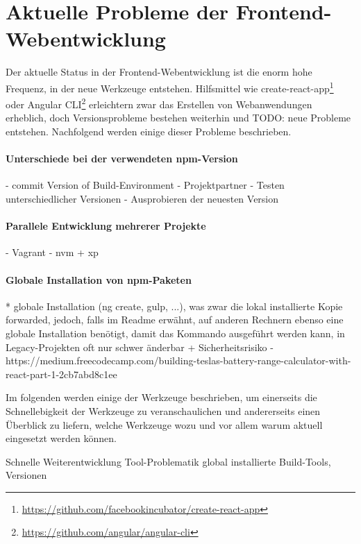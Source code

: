 \chapter{Aktuelle Probleme der Frontend-Webentwicklung}
\label{cha:frontend-problems}

Der aktuelle Status in der Frontend-Webentwicklung ist die enorm hohe Frequenz, in der neue Werkzeuge entstehen.
Hilfsmittel wie create-react-app\footnote{\url{https://github.com/facebookincubator/create-react-app}} oder Angular CLI\footnote{\url{https://github.com/angular/angular-cli}} erleichtern zwar das Erstellen von Webanwendungen erheblich, doch Versionsprobleme bestehen weiterhin und TODO: neue Probleme entstehen.
Nachfolgend werden einige dieser Probleme beschrieben.

\subsubsection{Unterschiede bei der verwendeten npm-Version}
- commit Version of Build-Environment
- Projektpartner
- Testen unterschiedlicher Versionen
- Ausprobieren der neuesten Version

\subsubsection{Parallele Entwicklung mehrerer Projekte}
- Vagrant
- nvm + xp

\subsubsection{Globale Installation von npm-Paketen}
* globale Installation (ng create, gulp, ...), was zwar die lokal installierte Kopie forwarded, jedoch, falls im Readme erwähnt, auf anderen Rechnern ebenso eine globale Installation benötigt, damit das Kommando ausgeführt werden kann, in Legacy-Projekten oft nur schwer änderbar + Sicherheitsrisiko
 - https://medium.freecodecamp.com/building-teslas-battery-range-calculator-with-react-part-1-2cb7abd8c1ee

Im folgenden werden einige der Werkzeuge beschrieben, um einerseits die Schnellebigkeit der Werkzeuge zu veranschaulichen und andererseits einen Überblick zu liefern, welche Werkzeuge wozu und vor allem warum aktuell eingesetzt werden können.

Schnelle Weiterentwicklung
Tool-Problematik
global installierte Build-Tools, Versionen

